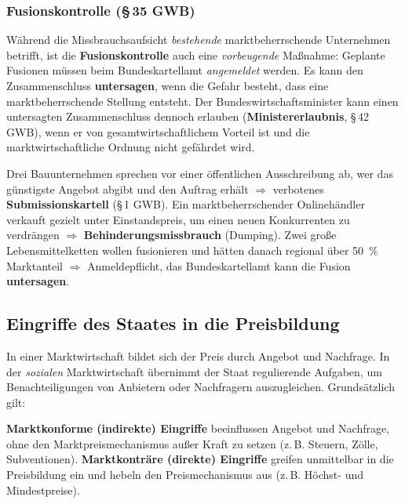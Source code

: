 \documentclass[11pt, a4paper]{article}
\begin{document}
\subsubsection{Fusionskontrolle (\S\,35 GWB)}

Während die Missbrauchsaufsicht \emph{bestehende} marktbeherrschende Unternehmen betrifft,
ist die \textbf{Fusionskontrolle} auch eine \emph{vorbeugende} Maßnahme: Geplante Fusionen
müssen beim Bundeskartellamt \emph{angemeldet} werden. Es kann den Zusammenschluss
\textbf{untersagen}, wenn die Gefahr besteht, dass eine marktbeherrschende Stellung
entsteht. Der Bundeswirtschaftsminister kann einen untersagten Zusammenschluss dennoch
erlauben (\textbf{Ministererlaubnis}, \S\,42 GWB), wenn er von gesamtwirtschaftlichem
Vorteil ist und die marktwirtschaftliche Ordnung nicht gefährdet wird.

\begin{beispiel}
Drei Bauunternehmen sprechen vor einer öffentlichen Ausschreibung ab, wer das günstigste
Angebot abgibt und den Auftrag erhält $\Rightarrow$ verbotenes
\textbf{Submissionskartell} (\S\,1 GWB). Ein marktbeherrschender Onlinehändler verkauft
gezielt unter Einstandspreis, um einen neuen Konkurrenten zu verdrängen $\Rightarrow$
\textbf{Behinderungsmissbrauch} (Dumping). Zwei große Lebensmittelketten wollen
fusionieren und hätten danach regional über 50~\% Marktanteil $\Rightarrow$ Anmeldepflicht,
das Bundeskartellamt kann die Fusion \textbf{untersagen}.
\end{beispiel}

\subsection{Eingriffe des Staates in die Preisbildung}

In einer Marktwirtschaft bildet sich der Preis durch Angebot und Nachfrage. In der
\emph{sozialen} Marktwirtschaft übernimmt der Staat regulierende Aufgaben, um
Benachteiligungen von Anbietern oder Nachfragern auszugleichen. Grundsätzlich gilt:

\begin{merksatz}
\textbf{Marktkonforme (indirekte) Eingriffe} beeinflussen Angebot und Nachfrage, ohne den
Marktpreismechanismus außer Kraft zu setzen (z.\,B. Steuern, Zölle, Subventionen).
\textbf{Marktkonträre (direkte) Eingriffe} greifen unmittelbar in die Preisbildung ein
und hebeln den Preismechanismus aus (z.\,B. Höchst- und Mindestpreise).
\end{merksatz}
\end{document}
